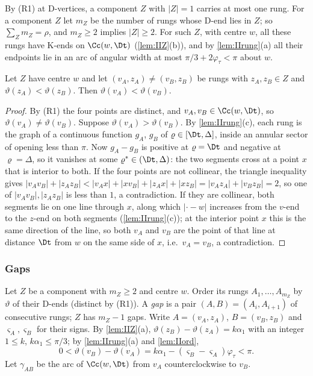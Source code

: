 By (R1) at D-vertices, a component $Z$ with $|Z|=1$ carries at most one rung. For a component $Z$ let $m_Z$ be the number of rungs whose D-end lies in $Z$; so $\sum_Zm_Z=\rho$, and $m_Z\ge2$ implies $|Z|\ge2$. For such $Z$, with centre $w$, all these rungs have K-ends on $\Cc(w,\Dt)$ (\cref{lem:IIZ}(b)), and by \cref{lem:IIrung}(a) all their endpoints lie in an arc of angular width at most $\pi/3+2\varphi_\tau<\pi$ about $w$.

\begin{lemma}[order]\label{lem:IIord}
Let $Z$ have centre $w$ and let $(v_A,z_A)\neq(v_B,z_B)$ be rungs with $z_A,z_B\in Z$ and $\vartheta(z_A)<\vartheta(z_B)$. Then $\vartheta(v_A)<\vartheta(v_B)$.
\end{lemma}
\begin{proof}
By (R1) the four points are distinct, and $v_A,v_B\in\Cc(w,\Dt)$, so $\vartheta(v_A)\neq\vartheta(v_B)$. Suppose $\vartheta(v_A)>\vartheta(v_B)$. By \cref{lem:IIrung}(c), each rung is the graph of a continuous function $g_A$, $g_B$ of $\varrho\in[\Dt,\Delta]$, inside an annular sector of opening less than $\pi$. Now $g_A-g_B$ is positive at $\varrho=\Dt$ and negative at $\varrho=\Delta$, so it vanishes at some $\varrho^*\in(\Dt,\Delta)$: the two segments cross at a point $x$ that is interior to both. If the four points are not collinear, the triangle inequality gives $|v_Av_B|+|z_Az_B|<|v_Ax|+|xv_B|+|z_Ax|+|xz_B|=|v_Az_A|+|v_Bz_B|=2$, so one of $|v_Av_B|,|z_Az_B|$ is less than $1$, a contradiction. If they are collinear, both segments lie on one line through $x$, along which $|\cdot-w|$ increases from the $v$-end to the $z$-end on both segments (\cref{lem:IIrung}(c)); at the interior point $x$ this is the same direction of the line, so both $v_A$ and $v_B$ are the point of that line at distance $\Dt$ from $w$ on the same side of $x$, i.e.\ $v_A=v_B$, a contradiction.
\end{proof}

\subsubsection*{Gaps}
Let $Z$ be a component with $m_Z\ge2$ and centre $w$. Order its rungs $A_1,\dots,A_{m_Z}$ by $\vartheta$ of their D-ends (distinct by (R1)). A \emph{gap} is a pair $(A,B)=(A_i,A_{i+1})$ of consecutive rungs; $Z$ has $m_Z-1$ gaps. Write $A=(v_A,z_A)$, $B=(v_B,z_B)$ and $\varsigma_A,\varsigma_B$ for their signs. By \cref{lem:IIZ}(a), $\vartheta(z_B)-\vartheta(z_A)=k\alpha_1$ with an integer $1\le k$, $k\alpha_1\le\pi/3$; by \cref{lem:IIrung}(a) and \cref{lem:IIord},
\begin{equation}\label{eq:IIgapangle}
0<\vartheta(v_B)-\vartheta(v_A)=k\alpha_1-(\varsigma_B-\varsigma_A)\varphi_\tau<\pi .
\end{equation}
Let $\gamma_{AB}$ be the arc of $\Cc(w,\Dt)$ from $v_A$ counterclockwise to $v_B$.

